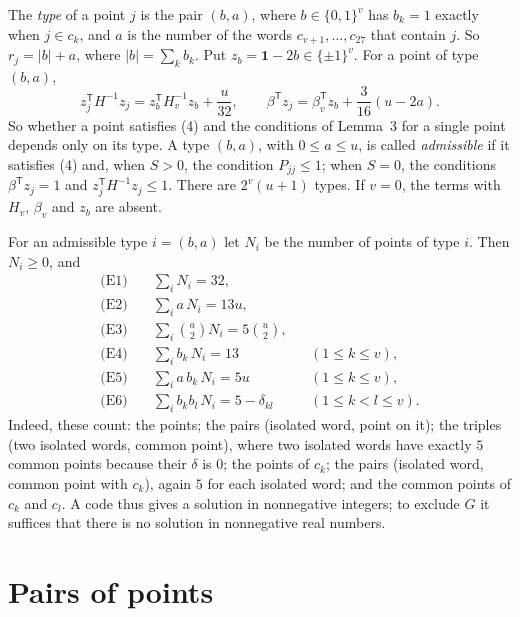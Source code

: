 \documentclass[11pt,a4paper]{article}
\newcommand{\abs}[1]{\lvert #1\rvert}
\newcommand{\one}{\mathbf{1}}
\newcommand{\T}{^{\mathsf T}}
\begin{document}
The \emph{type} of a point $j$ is the pair $(b,a)$, where
$b\in\{0,1\}^v$ has $b_k=1$ exactly when $j\in c_k$, and $a$ is the number
of the words $c_{v+1},\dots,c_{27}$ that contain $j$. So
$r_j=\abs b+a$, where $\abs b=\sum_k b_k$. Put $z_b=\one-2b\in\{\pm1\}^v$.
For a point of type $(b,a)$,
\begin{equation}
z_j\T H^{-1}z_j=z_b\T H_v^{-1}z_b+\frac u{32},\qquad
\beta\T z_j=\beta_v\T z_b+\frac3{16}(u-2a). \tag{6}
\end{equation}
So whether a point satisfies (4) and the conditions of Lemma~3 for a single
point depends only on its type. A type $(b,a)$, with $0\le a\le u$, is
called \emph{admissible} if it satisfies (4) and, when $S>0$, the condition
$P_{jj}\le 1$; when $S=0$, the conditions $\beta\T z_j=1$ and
$z_j\T H^{-1}z_j\le 1$. There are $2^v(u+1)$ types. If $v=0$, the terms
with $H_v$, $\beta_v$ and $z_b$ are absent.

For an admissible type $i=(b,a)$ let $N_i$ be the number of points of type
$i$. Then $N_i\ge 0$, and
\begin{align*}
\text{(E1)}\quad & \textstyle\sum_i N_i=32, \\
\text{(E2)}\quad & \textstyle\sum_i a\,N_i=13u, \\
\text{(E3)}\quad & \textstyle\sum_i \binom a2 N_i=5\binom u2, \\
\text{(E4)}\quad & \textstyle\sum_i b_k\,N_i=13 && (1\le k\le v),\\
\text{(E5)}\quad & \textstyle\sum_i a\,b_k\,N_i=5u && (1\le k\le v),\\
\text{(E6)}\quad & \textstyle\sum_i b_kb_l\,N_i=5-\delta_{kl} && (1\le k<l\le v).
\end{align*}
Indeed, these count: the points; the pairs (isolated word, point on it);
the triples (two isolated words, common point), where two isolated words
have exactly $5$ common points because their $\delta$ is $0$; the points of
$c_k$; the pairs (isolated word, common point with $c_k$), again $5$ for
each isolated word; and the common points of $c_k$ and $c_l$. A code thus
gives a solution in nonnegative integers; to exclude $G$ it suffices that
there is no solution in nonnegative real numbers.

\section{Pairs of points}
\end{document}
